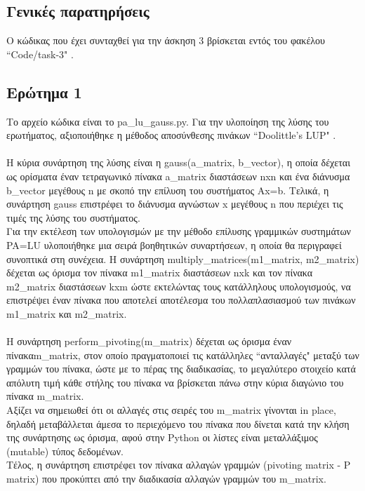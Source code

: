 \documentclass[a4paper,11pt]{article}
\newcommand{\lt}{\latintext}
\begin{document}
\subsection*{Γενικές παρατηρήσεις}
Ο κώδικας που έχει συνταχθεί για την άσκηση 3 βρίσκεται εντός του φακέλου {\lt ``Code/task-3" }.\\
\subsection*{Ερώτημα 1}
Το αρχείο κώδικα είναι το {\lt pa\_lu\_gauss.py}.
Για την υλοποίηση της λύσης του ερωτήματος, αξιοποιήθηκε η μέθοδος αποσύνθεσης πινάκων {\lt ``Doolittle's LUP" }.\\
\\Η κύρια συνάρτηση της λύσης είναι η {\lt gauss(a\_matrix, b\_vector)}, η οποία δέχεται ως ορίσματα έναν τετραγωνικό πίνακα {\lt a\_matrix} διαστάσεων {\lt nxn} και ένα διάνυσμα {\lt b\_vector} μεγέθους {\lt n} με σκοπό την επίλυση του συστήματος {\lt Ax=b}. Τελικά, η συνάρτηση {\lt gauss} επιστρέφει το διάνυσμα αγνώστων {\lt x} μεγέθους {\lt n} που περιέχει τις τιμές της λύσης του συστήματος.\\
Για την εκτέλεση των υπολογισμών με την μέθοδο επίλυσης γραμμικών συστημάτων {\lt PA=LU} υλοποιήθηκε μια σειρά βοηθητικών συναρτήσεων, η οποία θα περιγραφεί συνοπτικά στη συνέχεια. 
Η συνάρτηση {\lt multiply\_matrices(m1\_matrix, m2\_matrix)} δέχεται ως όρισμα τον πίνακα {\lt m1\_matrix} διαστάσεων {\lt nxk} και τον πίνακα {\lt m2\_matrix} διαστάσεων {\lt kxm} ώστε εκτελώντας τους κατάλληλους υπολογισμούς, να επιστρέψει έναν πίνακα που αποτελεί αποτέλεσμα του πολλαπλασιασμού των πινάκων {\lt m1\_matrix} και {\lt m2\_matrix}.\\
\\H συνάρτηση {\lt perform\_pivoting(m\_matrix)} δέχεται ως όρισμα έναν πίνακα{\lt m\_matrix}, στον οποίο πραγματοποιεί τις κατάλληλες ``ανταλλαγές" μεταξύ των γραμμών του πίνακα, ώστε με το πέρας της διαδικασίας,  το μεγαλύτερο στοιχείο κατά απόλυτη τιμή κάθε στήλης του πίνακα να βρίσκεται πάνω στην κύρια διαγώνιο του πίνακα {\lt m\_matrix}. \\Αξίζει να σημειωθεί ότι οι αλλαγές στις σειρές του {\lt m\_matrix} γίνονται {\lt in place},
δηλαδή μεταβάλλεται άμεσα το περιεχόμενο του πίνακα που δίνεται κατά την κλήση της συνάρτησης ως όρισμα, αφού στην {\lt Python} οι λίστες είναι μεταλλάξιμος {\lt (mutable)} τύπος δεδομένων.\\
Τέλος, η συνάρτηση επιστρέφει τον πίνακα αλλαγών γραμμών {\lt (pivoting matrix - P matrix)} που προκύπτει από την διαδικασία αλλαγών γραμμών του {\lt m\_matrix}.\\
\end{document}
